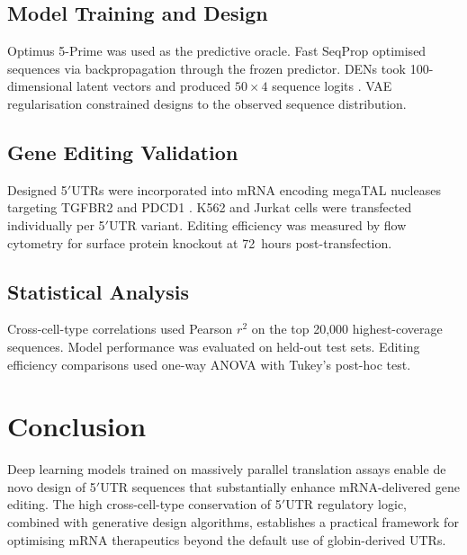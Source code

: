 \documentclass[11pt]{article}
\begin{document}
\subsection{Model Training and Design}
Optimus 5-Prime \citep{sample2019human} was used as the predictive oracle. Fast SeqProp optimised sequences via backpropagation through the frozen predictor. DENs took 100-dimensional latent vectors and produced $50 \times 4$ sequence logits \citep{linder2020fast}. VAE regularisation \citep{kingma2014auto} constrained designs to the observed sequence distribution.

\subsection{Gene Editing Validation}
Designed 5$'$UTRs were incorporated into mRNA encoding megaTAL nucleases targeting TGFBR2 and PDCD1 \citep{killian2017installgen}. K562 and Jurkat cells were transfected individually per 5$'$UTR variant. Editing efficiency was measured by flow cytometry for surface protein knockout at 72~hours post-transfection.

\subsection{Statistical Analysis}
Cross-cell-type correlations used Pearson $r^2$ on the top 20,000 highest-coverage sequences. Model performance was evaluated on held-out test sets. Editing efficiency comparisons used one-way ANOVA with Tukey's post-hoc test.

\section{Conclusion}

Deep learning models trained on massively parallel translation assays enable de novo design of 5$'$UTR sequences that substantially enhance mRNA-delivered gene editing. The high cross-cell-type conservation of 5$'$UTR regulatory logic, combined with generative design algorithms, establishes a practical framework for optimising mRNA therapeutics beyond the default use of globin-derived UTRs.



\end{document}
